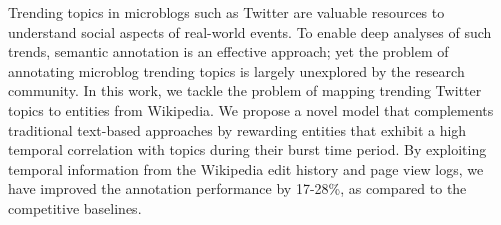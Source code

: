Trending topics in microblogs such as Twitter are valuable resources to understand social aspects of real-world events. To enable deep analyses of such trends, semantic annotation is an effective approach; yet the problem of annotating microblog trending topics is largely unexplored by the research community. In this work, we tackle the problem of mapping trending Twitter topics to entities from Wikipedia. We propose a novel model that complements traditional text-based approaches by rewarding entities that exhibit a high temporal correlation with topics during their burst time period. By exploiting temporal information from the Wikipedia edit history and page view logs, we have improved the annotation performance by 17-28\%, as compared to the competitive baselines.
